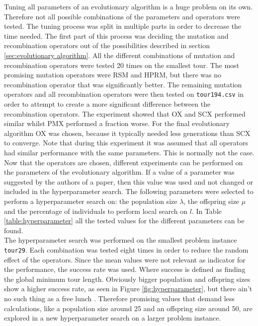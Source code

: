 \documentclass[a4paper,10pt]{article}
\begin{document}
Tuning all parameters of an evolutionary algorithm is a huge problem on its own. Therefore not all possible combinations of the parameters and operators were tested. The tuning process was split in multiple parts in order to decrease the time needed. The first part of this process was deciding the mutation and recombination operators out of the possibilities described in section \ref{sec:evolutionary algorithm}. All the different combinations of mutation and recombination operators were tested 20 times on the smallest tour. The most promising mutation operators were RSM and HPRM, but there was no recombination operator that was significantly better. The remaining mutation operators and all recombination operators were then tested on \texttt{tour194.csv} in order to attempt to create a more significant difference between the recombination operators. The experiment showed that OX and SCX performed similar whilst PMX performed a fraction worse. For the final evolutionary algorithm OX was chosen, because it typically needed less generations than SCX to converge. Note that during this experiment it was assumed that all operators had similar performance with the same parameters. This is normally not the case.\\

Now that the operators are chosen, different experiments can be performed on the parameters of the evolutionary algorithm. If a value of a parameter was suggested by the authors of a paper, then this value was used and not changed or included in the hyperparameter search. The following parameters were selected to perform a hyperparameter search on: the population size $\lambda$, the offspring size $\mu$ and the percentage of individuals to perform local search on $l$. In Table \ref{table:hyperparameter} all the tested values for the different parameters can be found.\\
The hyperparameter search was performed on the smallest problem instance \texttt{tour29}. Each combination was tested eight times in order to reduce the random effect of the operators. Since the mean values were not relevant as indicator for the performance, the success rate was used. Where success is defined as finding the global minimum tour length. Obviously bigger population and offspring sizes show a higher success rate, as seen in Figure \ref{fig:hyperparameter}, but there ain't no such thing as a free lunch \cite{freelunch}. Therefore promising values that demand less calculations, like a population size around 25 and an offspring size around 50, are explored in a new hyperparameter search on a larger problem instance.\\
\end{document}
